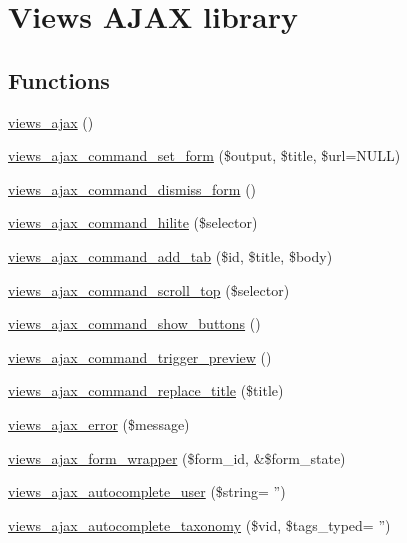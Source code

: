 \hypertarget{group__ajax}{
\section{Views AJAX library}
\label{group__ajax}
}
\subsection*{Functions}
\begin{DoxyCompactItemize}
\item 
\hyperlink{group__ajax_ga5f1adff7f07ea45d8ab62b456ffdd6e0}{views\_\-ajax} ()
\item 
\hyperlink{group__ajax_gac5062864272f5b8134072eb22a661e6f}{views\_\-ajax\_\-command\_\-set\_\-form} (\$output, \$title, \$url=NULL)
\item 
\hyperlink{group__ajax_gac0331ece9a64afe1350f116b9c5a79f1}{views\_\-ajax\_\-command\_\-dismiss\_\-form} ()
\item 
\hyperlink{group__ajax_ga22d27c9ab6b8a95f4903463eb6aabf8d}{views\_\-ajax\_\-command\_\-hilite} (\$selector)
\item 
\hyperlink{group__ajax_ga9e55776de616656e252b0f9eb8851e82}{views\_\-ajax\_\-command\_\-add\_\-tab} (\$id, \$title, \$body)
\item 
\hyperlink{group__ajax_gac7d8055fd4e9c91501496391dbe94b5a}{views\_\-ajax\_\-command\_\-scroll\_\-top} (\$selector)
\item 
\hyperlink{group__ajax_ga3ef672bfe39df163a3cf89ed23c8a0c2}{views\_\-ajax\_\-command\_\-show\_\-buttons} ()
\item 
\hyperlink{group__ajax_ga698e1518b153b16adbe61e3aeb376eac}{views\_\-ajax\_\-command\_\-trigger\_\-preview} ()
\item 
\hyperlink{group__ajax_ga42db219284fd40096900731ee6d13600}{views\_\-ajax\_\-command\_\-replace\_\-title} (\$title)
\item 
\hyperlink{group__ajax_ga59f31023b894be21852b7034f639523f}{views\_\-ajax\_\-error} (\$message)
\item 
\hyperlink{group__ajax_ga7eed0d665d7b4c8c8134eb060afbb2be}{views\_\-ajax\_\-form\_\-wrapper} (\$form\_\-id, \&\$form\_\-state)
\item 
\hyperlink{group__ajax_ga0d9404f1a04f9f5102ffac0bef92d5ab}{views\_\-ajax\_\-autocomplete\_\-user} (\$string= '')
\item 
\hyperlink{group__ajax_ga4aed960e2ee6b6e516e609188852c0f6}{views\_\-ajax\_\-autocomplete\_\-taxonomy} (\$vid, \$tags\_\-typed= '')
\end{DoxyCompactItemize}


